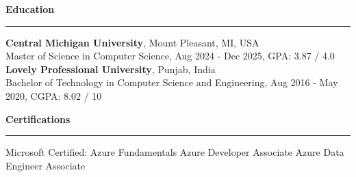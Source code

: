 \documentclass[10pt,letterpaper]{article}
\newcommand{\ressection}[1]{%
  \vspace{4pt}\par\textbf{#1}\par\vspace{1.5pt}\hrule\vspace{2.5pt}
}
\begin{document}
\ressection{Education}
\textbf{Central Michigan University}, Mount Pleasant, MI, USA\\
Master of Science in Computer Science, Aug 2024 - Dec 2025, GPA: 3.87 / 4.0\\
\textbf{Lovely Professional University}, Punjab, India\\
Bachelor of Technology in Computer Science and Engineering, Aug 2016 - May 2020, CGPA: 8.02 / 10

\ressection{Certifications}
Microsoft Certified: Azure Fundamentals \textbar{} Azure Developer Associate \textbar{} Azure Data Engineer Associate
\end{document}
